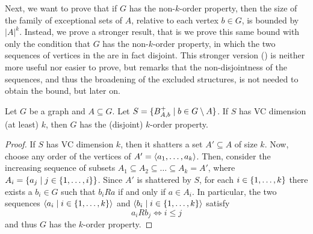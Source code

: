     Next, we want to prove that if $G$ has the non-$k$-order property, then the size of the family of exceptional
    sets of $A$, relative to each vertex $b \in G$, is bounded by $|A|^k$.
    Instead, we prove a stronger result, that is we prove this same bound with only the condition that $G$
    has the  non-$k$-order property, in which the two sequences of vertices in the 
    are in fact disjoint.
    This stronger version () is neither more useful nor easier to prove,
    but remarks that the non-disjointness of the sequences, and thus the broadening of the excluded structures,
    is not needed to obtain the bound, but later on.

    \begin{lemma} \label{lem:vc_dimension_implies_k_order_property}
        Let $G$ be a graph and $A \subseteq G$.
        Let $S = \{ B^+_{A,b} \mid b \in G \setminus A \}$.
        If $S$ has VC dimension (at least) $k$, then $G$ has the (disjoint)
        $k$-order property.
        \begin{proof}
            If $S$ has VC dimension $k$, then it shatters a set $A' \subseteq A$ of size $k$.
            Now, choose any order of the vertices of $A' = \left< a_1, \dots, a_k \right>$.
            Then, consider the increasing sequence of subsets $A_1 \subseteq A_2 \subseteq \dots \subseteq A_k = A'$,
            where $A_i = \{ a_j \mid j \in \{ 1, \dots, i \} \}$.
            Since $A'$ is shattered by $S$, for each $i \in \{ 1, \dots, k \}$ there exists a $b_i \in G$ such that
            $b_i R a$ if and only if $a \in A_i$.
            In particular, the two sequences $\left< a_i \mid i \in \{ 1, \dots, k \} \right>$ and
            $\left< b_i \mid i \in \{ 1, \dots, k \} \right>$ satisfy
            \[
                a_i R b_j \Leftrightarrow i \leq j
            \]
            and thus $G$ has the $k$-order property.
        \end{proof}
    \end{lemma}

